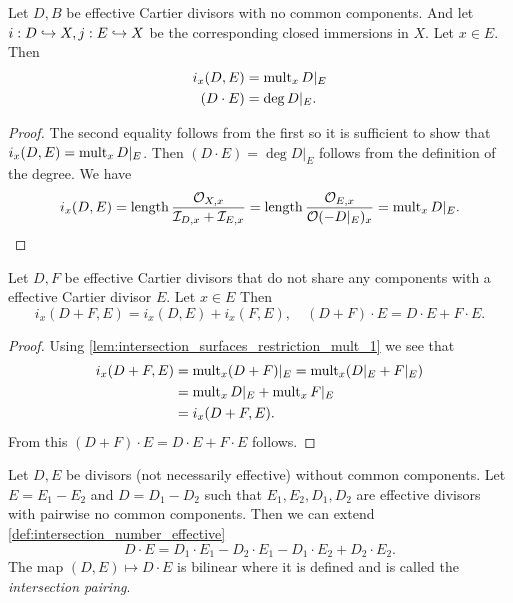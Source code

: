\begin{lemma}\label{lem:intersection_surfaces_restriction_mult_1}
	Let $D, B$ be effective Cartier divisors with no common components. And let $i: D \hookrightarrow X, j: E \hookrightarrow X$ be the corresponding closed immersions in $X$. 
	Let $x \in E$. Then  
	\begin{align*}
		i_x(D, E) &= \operatorname{mult}_x D|_E   \\
		(D\cdot E) &= \deg D|_E 
	.\end{align*}
\end{lemma}
\begin{proof}
	The second equality follows from the first so it is sufficient to show that $i_x(D, E) = \operatorname{mult}_x D|_E$. 
	Then $(D\cdot E) =\deg D|_E$ follows from the definition of the degree.  
	We have \[
		i_x(D, E) = \operatorname{length} \frac{\mathcal{O}_{X, x}}{\mathcal{I} _{D, x} + \mathcal{I} _{E, x}} =\operatorname{length} \frac{\mathcal{O}_{E, x}}{\mathcal{O}(-D|_E)_x} = \operatorname{mult}_x D|_E \\
	.\] 
\end{proof}
\begin{lemma}
	Let $D, F$ be effective Cartier divisors that do not share any components with a effective Cartier divisor $E$. Let $x \in E$
	Then  \[
		i_x (D + F, E) = i_x(D, E) + i_x(F, E), \quad (D + F) \cdot E = D\cdot E + F \cdot E
	.\] 
\end{lemma}
\begin{proof}
	Using \cref{lem:intersection_surfaces_restriction_mult_1} we see that 
	\begin{align*}
		i_x (D + F, E) &= \operatorname{mult}_x (D + F)|_E = \operatorname{mult}_x (D|_E + F|_E) \\
			       &= \operatorname{mult}_x D|_E + \operatorname{mult}_x F|_E \\
			       &= i_x(D + F, E) 
	.\end{align*}
	From this $(D + F) \cdot E = D\cdot E + F \cdot E$ follows.
\end{proof}


\begin{definition}
	Let $D, E$ be divisors (not necessarily effective) without common components. 
	Let $E = E_1 - E_2$ and $D = D_1 - D_2$ such that $E_1, E_2, D_1, D_2$ are effective divisors with pairwise no common components. 
	Then we can extend \cref{def:intersection_number_effective} 
	\[
	D\cdot E = D_1 \cdot E_1 - D_2 \cdot E_1 - D_1 \cdot E_2 + D_2 \cdot  E_2
	.\] 
	The map $(D, E )\mapsto D\cdot E$ is bilinear where it is defined and is called the \emph{intersection pairing}.
\end{definition}

